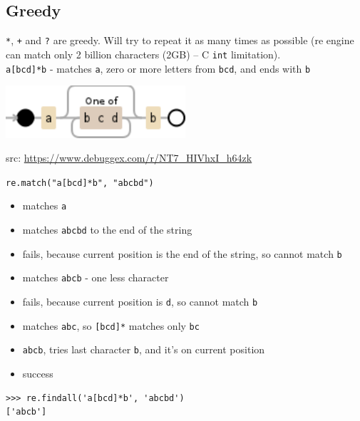 \documentclass{beamer}
\begin{document}
\subsection{Greedy}
\begin{frame}[fragile]
\verb/*/, \verb/+/ and \verb/?/ are greedy. Will try to repeat it as many times as possible (re engine can match only 2 billion characters (2GB) -- C \verb/int/ limitation). \\
\pause
\verb/a[bcd]*b/ - matches \verb/a/, zero or more letters from \verb/bcd/, and ends with \verb/b/ \\
\begin{center}
\includegraphics[width=0.5\textwidth]{images/greedy.png}
\end{center}
src: \url{https://www.debuggex.com/r/NT7_HIVhxI_h64zk}
\end{frame}

\begin{frame}[fragile]
\verb/re.match("a[bcd]*b", "abcbd")/
\begin{itemize}
\item matches \verb/a/
\pause
\item matches \verb/abcbd/ to the end of the string
\pause
\item fails, because current position is the end of the string, so cannot match \verb/b/
\pause
\item matches \verb/abcb/ - one less character
\pause
\item fails, because current position is \verb/d/, so cannot match \verb/b/
\pause
\item matches \verb/abc/, so \verb/[bcd]*/ matches only \verb/bc/
\pause
\item \verb/abcb/, tries last character \verb/b/, and it's on current position
\pause
\item success
\end{itemize}
\begin{lstlisting}
>>> re.findall('a[bcd]*b', 'abcbd')
['abcb']
\end{lstlisting}
\end{frame}
\end{document}
